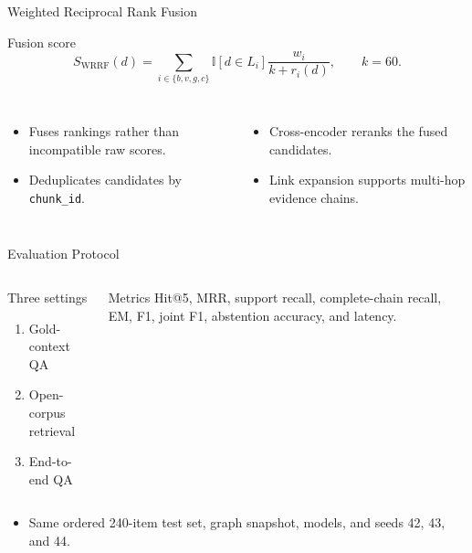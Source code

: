 \documentclass[aspectratio=169]{beamer}
\begin{document}
\begin{frame}{Weighted Reciprocal Rank Fusion}
\begin{block}{Fusion score}
\[
S_{\mathrm{WRRF}}(d)=\sum_{i\in\{b,v,g,c\}}\mathbb{I}[d\in L_i]\frac{w_i}{k+r_i(d)}, \qquad k=60.
\]
\end{block}
\begin{columns}[T]
\begin{itemize}
\item Fuses rankings rather than incompatible raw scores.
\item Deduplicates candidates by \texttt{chunk\_id}.
\end{itemize}
\begin{itemize}
\item Cross-encoder reranks the fused candidates.
\item Link expansion supports multi-hop evidence chains.
\end{itemize}
\end{columns}
\end{frame}

\begin{frame}{Evaluation Protocol}
\begin{columns}[T]
\begin{block}{Three settings}
\begin{enumerate}
\item Gold-context QA
\item Open-corpus retrieval
\item End-to-end QA
\end{enumerate}
\end{block}
\begin{block}{Metrics}
Hit@5, MRR, support recall, complete-chain recall, EM, F1, joint F1, abstention accuracy, and latency.
\end{block}
\end{columns}
\vspace{.35cm}
\begin{itemize}
\item Same ordered 240-item test set, graph snapshot, models, and seeds 42, 43, and 44.
\end{itemize}
\end{frame}
\end{document}
